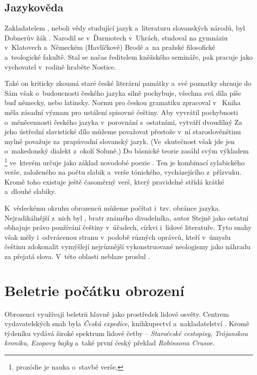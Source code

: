 \subsection*{Jazykověda
}
Zakladatelem , neboli vědy studující jazyk
a~literaturu slovanských národů, byl Dobnerův žák .
Narodil se v~Ďarmotech v~Uhrách, studoval na gymnáziu v~Klatovech
a~Německém (Havlíčkově) Brodě a~na pražské filosofické a~teologické
fakultě. Stal se načas ředitelem kněžského semináře, pak pracuje jako
vychovatel v~rodině hraběte Nostice.

Také on kriticky zkoumá staré české literární památky a~své poznatky
shrnuje do  Sám však o~budoucnosti
českého jazyka silně pochybuje, všechna svá díla píše buď německy, nebo
latinsky. Normu pro českou gramatiku zpracoval v~
Kniha měla zásadní význam pro ustálení spisovné češtiny. Aby
vyvrátil pochybnosti o~méněcennosti českého jazyka v~porovnání
s~ostatními, vytváří dvoudílný  Za jeho
ústřední slavistické dílo můžeme považovat  
přestože v~ní staroslověnštinu mylně považuje za~prapůvodní slovanský
jazyk. (Ve~skutečnost však jde jen o~makedonský dialekt z~okolí Soluně.)
Do básnické teorie zasáhl svým výkladem
\footnote{prozódie je nauka o~stavbě verše,}
ve~kterém určuje jako základ novodobé poezie . 
Ten je kombinací sylabického verše, založeného na počtu slabik
a~verše tónického, vycházejícího z~přízvuku. Kromě toho existuje ještě
časoměrný verš, který pravidelně střídá krátké a~dlouhé slabiky.

K~vědeckému okruhu obrozenců můžeme počítat i~tzv. obránce jazyka.
Nejradikálnější z~nich byl , bratr známého
divadelníka, autor 
Stejně jako ostatní obhajuje právo používání češtiny v~úřadech, církvi
i~lidové literatuře. Tyto snahy však měly i~odvrácenou stranu v~podobě
různých oprávců, kteří v~úmyslu češtinu zdokonalit vymýšlejí nejrůznější
vykonstruované neologismy jako náhradu za přejatá slova. V~této oblasti
neblaze proslul .

\section{Beletrie počátku obrození
}
Obrozenci využívají beletrii hlavně jako prostředek lidové osvěty.
Centrem vydavatelských snah byla \emph{Česká expedice}, knihkupectví 
a~nakladatelství . 
Kromě týdeníku  vydává široké spektrum
lidové četby -- \emph{Staročeské cestopisy}, \emph{Trójanskou kroniku},
\emph{Ezopovy bajky} a~také první český překlad \emph{Robinsona Crusoe}. 

